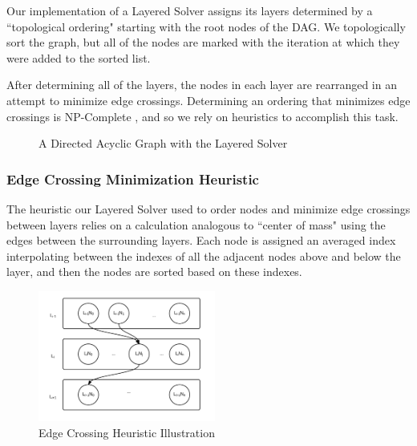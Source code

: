 \documentclass{article}
\begin{document}
Our implementation of a Layered Solver assigns its layers determined by a ``topological ordering" starting with the root nodes of the DAG. We topologically sort the graph, but all of the nodes are marked with the iteration at which they were added to the sorted list. 

After determining all of the layers, the nodes in each layer are rearranged in an attempt to minimize edge crossings. Determining an ordering that minimizes edge crossings is NP-Complete \cite{Eades:94}, and so we rely on heuristics to accomplish this task.

\begin{figure}
\caption{A Directed Acyclic Graph with the Layered Solver}
\end{figure}



\subsubsection{Edge Crossing Minimization Heuristic}
The heuristic our Layered Solver used to order nodes and minimize edge crossings between layers relies on a calculation analogous to ``center of mass" using the edges between the surrounding layers. Each node is assigned an averaged index interpolating between the indexes of all the adjacent nodes above and below the layer, and then the nodes are sorted based on these indexes. 


\begin{figure}
\caption{Edge Crossing Heuristic Illustration}\label{layers}
\centering
\includegraphics[width=0.52\textwidth]{layereddia.png}
\end{figure}
\end{document}
